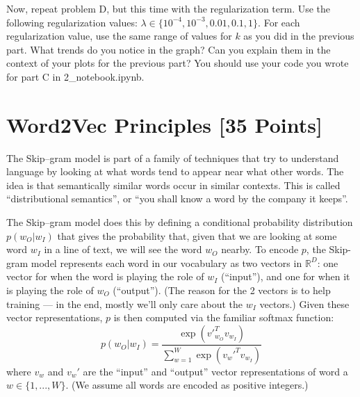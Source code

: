 \begin{solution}



\end{solution}

\problem[5]
Now, repeat problem D, but this time with the regularization term. Use the following regularization values: $\lambda \in \{10^{-4}, 10^{-3}, 0.01, 0.1, 1\}$. For each regularization value, use the same range of values for $k$ as you did in the previous part. What trends do you notice in the graph? Can you explain them in the context of your plots for the previous part? You should use your code you wrote for part C in 2_notebook.ipynb.

\begin{solution}



\end{solution}






\newpage
\section{Word2Vec Principles [35 Points]}

The Skip--gram model is part of a family of techniques that try to understand language by looking at what words tend to appear near what other words.  The idea is that semantically similar words occur in similar contexts.  This is called ``distributional semantics'', or ``you shall know a word by the company it keeps''.  

The Skip--gram model does this by defining a conditional probability distribution $p(w_O|w_I)$ that gives the probability that, given that we are looking at some word $w_I$ in a line of text, we will see the word $w_O$ nearby.  To encode $p$, the Skip-gram model represents each word in our vocabulary as two vectors in $\mathbb{R}^D$: one vector for when the word is playing the role of $w_I$ (``input''), and one for when it is playing the role of $w_O$ (``output'').  (The reason for the 2 vectors is to help training --- in the end, mostly we'll only care about the $w_I$ vectors.)  Given these vector representations, $p$ is then computed via the familiar softmax function:
\[ p(w_O|w_I) = \frac{\exp \left({v'}_{w_O}^T v_{w_I} \right)}{\sum_{w=1}^W \exp \left( {v_w'}^T v_{w_I} \right)} \tag{2} \label{eqn:softmax} \]
where $v_w$ and $v_w'$ are the ``input'' and ``output'' vector representations of word a $w \in \{1, ..., W\}$.  (We assume all words are encoded as positive integers.)

